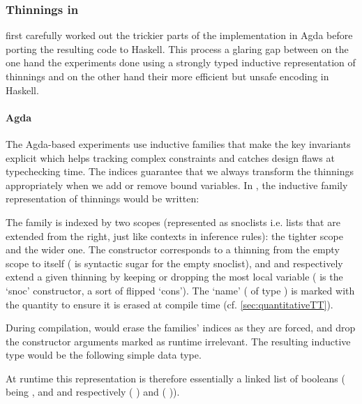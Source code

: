 \subsubsection{Thinnings in \typos}

\iftoggle{BLIND}{The authors}{We}
first carefully worked out the trickier parts of the implementation in Agda before
porting the resulting code to Haskell.
%
This process \iftoggle{BLIND}{highlights}{highlighted}
a glaring gap between on the one hand the experiments done
using a strongly typed inductive representation of thinnings and on the other hand
their more efficient but unsafe encoding in Haskell.

\paragraph{Agda}
The Agda-based experiments use inductive families that make the key invariants
explicit which helps tracking complex constraints and catches design flaws at
typechecking time.
%
The indices guarantee that we always transform the thinnings appropriately when
we add or remove bound variables. In \idris{}, the inductive family representation
of thinnings would be written:

%
The  family is indexed by two scopes (represented as snoclists
i.e. lists that are extended from the right, just like contexts in inference rules):
 the tighter scope and  the wider one.
%
The  constructor corresponds to a thinning from the empty scope to
itself (\IdrisData{[<]} is \idris{} syntactic sugar for the empty snoclist),
and  and  respectively extend a given thinning
by keeping or dropping the most local variable (\IdrisData{:<} is the `snoc'
constructor, a sort of flipped `cons').
%
The `name' ( of type ) is marked with the quantity
 to ensure it is erased at compile time (cf. \cref{sec:quantitativeTT}).

During compilation, \idris{} would erase the families' indices as they are forced,
and drop the constructor arguments marked as runtime irrelevant.
%
The resulting inductive type would be the following simple data type.


At runtime this representation is therefore essentially a linked list of booleans
( being , and  and 
respectively ( \IdrisData{::}) and ( \IdrisData{::})).


